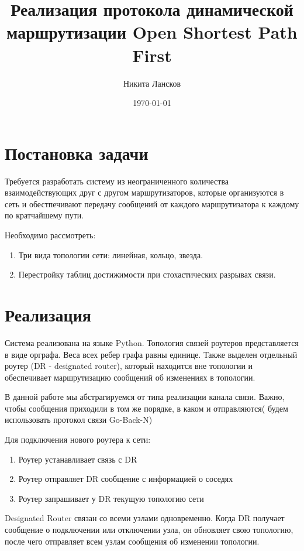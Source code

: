 \documentclass[a4paper,12pt]{article}
\author{Никита Лансков}
\title{Реализация протокола динамической маршрутизации
    Open Shortest Path First}
\date{\today}
\begin{document}

\maketitle
\tableofcontents

\newpage

\section{Постановка задачи}

Требуется разработать систему из неограниченного количества взаимодействующих
друг с другом маршрутизаторов, которые организуются в сеть и обестпечивают 
передачу сообщений от каждого маршрутизатора к каждому по кратчайшему пути.

Необходимо рассмотреть:
\begin{enumerate}
    \item Три вида топологии сети: линейная, кольцо, звезда.
    \item Перестройку таблиц достижимости при стохастических разрывах связи.
\end{enumerate}

\section{Реализация}

Система реализована на языке Python. Топология связей роутеров представляется
в виде орграфа. Веса всех ребер графа равны единице. Также выделен отдельный 
роутер (DR - designated router), который находится вне топологии и обеспечивает
маршрутизацию сообщений об изменениях в топологии.

В данной работе мы абстрагируемся от типа реализации канала связи. Важно, чтобы
сообщения приходили в том же порядке, в каком и отправляются( будем 
использовать протокол связи Go-Back-N)

Для подключения нового роутера к сети:
\begin{enumerate}
    \item Роутер устанавливает связь с DR
    \item Роутер отправляет DR сообщение с информацией о соседях
    \item Роутер запрашивает у DR текущую топологию сети
\end{enumerate}

Designated Router связан со всеми узлами одновременно.
Когда DR получает сообщение о подключении или отключении узла, он обновляет 
свою топологию, после чего отправляет всем узлам сообщения об изменении
топологии.
\end{document}
